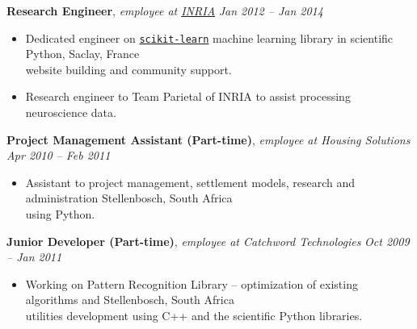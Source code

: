 \documentclass[9pt]{extarticle}
\begin{document}
\noindent
{\bf Research Engineer}, \textit{employee at \href{https://www.inria.fr/en}{INRIA}}  \hfill \textit{Jan 2012 -- Jan 2014}
\begin{itemize}
\setlength\itemsep{0.05em}

\item Dedicated engineer on \href{https://scikit-learn.org/stable/}{\texttt{scikit-learn}} machine learning library in scientific Python, \hfill Saclay, France \\
website building and community support.
\item Research engineer to Team Parietal of INRIA to assist processing neuroscience data.

\end{itemize}

\noindent
{\bf Project Management Assistant (Part-time)}, \textit{employee at Housing Solutions}  \hfill \textit{Apr 2010 -- Feb 2011}
\begin{itemize}
\setlength\itemsep{0.05em}
\item Assistant to project management, settlement models, research and administration \hfill Stellenbosch, South Africa \\
using Python.

\end{itemize}

\noindent
{\bf Junior Developer (Part-time)}, \textit{employee at Catchword Technologies}  \hfill \textit{Oct 2009 -- Jan 2011}
\begin{itemize}
\setlength\itemsep{0.05em}

\item Working on Pattern Recognition Library – optimization of existing algorithms and \hfill Stellenbosch, South Africa \\
utilities development using C++ and the scientific Python libraries.

\end{itemize}
\end{document}
